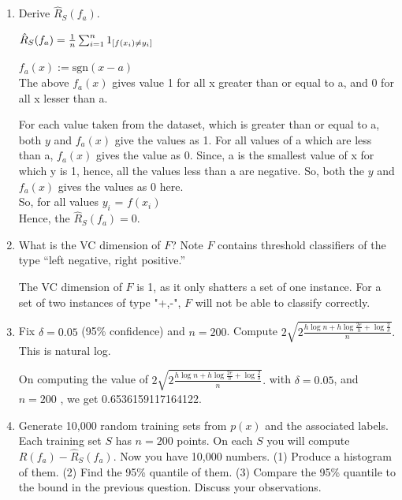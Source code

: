 \documentclass[a4paper]{article}
\theoremstyle{definition}
\newcommand{\sgn}{\mathrm{sgn}}
\newenvironment{soln}{
    \leavevmode\color{blue}\ignorespaces
}{}
\begin{document}
\begin{enumerate}
\begin{soln}
\end{soln}


\item Derive $\hat R_S(f_a)$.
\begin{soln}
	
$\hat R_S(f_a) =  {1\over n} \sum_{i=1}^n 1_{[f(x_i)\neq y_i]}$	

$f_a(x) := \sgn(x-a)$ 
\\The above $f_a(x)$ gives value 1 for all x greater than or equal to a, and 0 for all x lesser than a.

For each value taken from the dataset, which is greater than or equal to a, both $y$ and $f_a(x)$ give the values as 1. 
For all values of a which are less than a, $f_a(x)$ gives the value as 0. Since, a is the smallest value of x for which y is 1, hence, all the values less than a are negative. So, both the $y$ and $f_a(x)$ gives the values as 0 here.
\\So, for all values $y_i$ = $f(x_i)$
\\Hence, the $\hat R_S(f_a) = 0$.


\end{soln}

\item What is the VC dimension of $F$?  Note $F$ contains threshold classifiers of the type ``left negative, right positive.''
\begin{soln}
	

The VC dimension of $F$ is 1, as it only shatters a set of one instance. For a set of two instances of type "+,-", $F$ will not be able to classify correctly. 

\end{soln}


\item Fix $\delta=0.05$ (95\% confidence) and $n=200$.  Compute 
$2 \sqrt{2 \frac{h \log n + h \log\frac{2e}{h}  + \log \frac{2}{\delta} }{n}}.$
This is natural log.

\begin{soln}
	On computing the value of $2 \sqrt{2 \frac{h \log n + h \log\frac{2e}{h}  + \log \frac{2}{\delta} }{n}}.$ with $\delta=0.05$, and $n=200$ , we get 0.6536159117164122.
	
\end{soln}

\item Generate 10,000 random training sets from $p(x)$ and the associated labels.  Each training set $S$ has $n=200$ points.
On each $S$ you will compute $R(f_a) - \hat R_S(f_a)$.
Now you have 10,000 numbers. (1) Produce a histogram of them.  (2) Find the 95\% quantile of them.  (3) Compare the 95\% quantile to the bound in the previous question.  Discuss your observations.


\end{enumerate}
\end{document}

